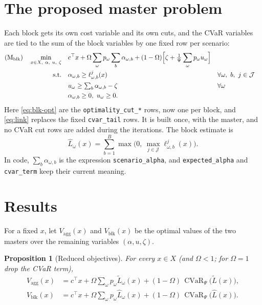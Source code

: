 \documentclass[11pt]{article}
\newtheorem{proposition}{Proposition}
\theoremstyle{remark}
\newcommand{\J}{\mathcal{J}}
\newcommand{\Lh}{\widehat{L}}
\newcommand{\Lt}{\widetilde{L}}
\newcommand{\CVaR}{\operatorname{CVaR}}
\begin{document}
\section{The proposed master problem}

Each block gets its own cost variable and its own cuts, and the CVaR variables are tied to the sum of
the block variables by one fixed row per scenario:
\begin{align}
  \text{(M\textsubscript{blk})}\quad
  \min_{x\in X,\ \alpha,\ u,\ \zeta}\quad
    & c^\top x + \Omega \sum_\omega p_\omega \sum_b \alpha_{\omega,b}
      + (1-\Omega)\Big[\zeta + \tfrac{1}{\Psi}\sum_\omega p_\omega u_\omega\Big] \notag\\
  \text{s.t.}\quad
    & \alpha_{\omega,b} \ge \ell^j_{\omega,b}(x)
      && \forall \omega,\ b,\ j \in \J \label{eq:blk-opt}\\
    & u_\omega \ge \textstyle\sum_b \alpha_{\omega,b} - \zeta
      && \forall \omega \label{eq:link}\\
    & \alpha_{\omega,b} \ge 0,\ u_\omega \ge 0. \notag
\end{align}
Here \eqref{eq:blk-opt} are the \texttt{optimality\_cut\_*} rows, now one per block, and
\eqref{eq:link} replaces the fixed \texttt{cvar\_tail} rows. It is built once, with the master, and
no CVaR cut rows are added during the iterations.
The block estimate is
\begin{equation}
  \Lh_\omega(x) = \sum_{b=1}^{B} \max\Big(0,\ \max_{j\in\J} \ell^j_{\omega,b}(x)\Big).
\end{equation}
In code, $\sum_b \alpha_{\omega,b}$ is the expression \texttt{scenario\_alpha}, and
\texttt{expected\_alpha} and \texttt{cvar\_term} keep their current meaning.

\section{Results}

For a fixed $x$, let $V_{\text{agg}}(x)$ and $V_{\text{blk}}(x)$ be the optimal values of the two
masters over the remaining variables $(\alpha, u, \zeta)$.

\begin{proposition}[Reduced objectives]\label{prop:reduced}
For every $x \in X$ (and $\Omega < 1$; for $\Omega = 1$ drop the CVaR term),
\begin{align}
  V_{\text{agg}}(x) &= c^\top x + \Omega \sum_\omega p_\omega \Lt_\omega(x)
                       + (1-\Omega)\,\CVaR_\Psi\big(\Lt(x)\big),\\
  V_{\text{blk}}(x) &= c^\top x + \Omega \sum_\omega p_\omega \Lh_\omega(x)
                       + (1-\Omega)\,\CVaR_\Psi\big(\Lh(x)\big).
\end{align}
\end{proposition}
\end{document}
